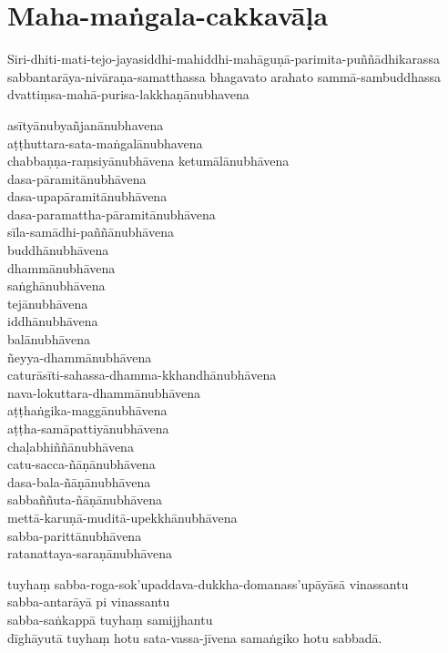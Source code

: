 
\section{Maha-maṅgala-cakkavāḷa}


Siri-dhiti-mati-tejo-jayasiddhi-mahiddhi-mahāguṇā-parimita-puññādhikarassa
sabbantarāya-nivāraṇa-samatthassa bhagavato arahato sammā-sambuddhassa
dvattiṃsa-mahā-purisa-lakkhaṇānubhavena

asītyānubyañjanānubhavena\\
aṭṭhuttara-sata-maṅgalānubhavena\\
chabbaṇṇa-raṃsiyānubhāvena ketumālānubhāvena\\
dasa-pāramitānubhāvena\\
dasa-upapāramitānubhāvena\\
dasa-paramattha-pāramitānubhāvena\\
sīla-samādhi-paññānubhāvena\\
buddhānubhāvena\\
dhammānubhāvena\\
saṅghānubhāvena\\
tejānubhāvena\\
iddhānubhāvena\\
balānubhāvena\\
ñeyya-dhammānubhāvena\\
caturāsīti-sahassa-dhamma-kkhandhānubhāvena\\
nava-lokuttara-dhammānubhāvena\\
aṭṭhaṅgika-maggānubhāvena\\
aṭṭha-samāpattiyānubhāvena\\
chaḷabhiññānubhāvena\\
catu-sacca-ñāṇānubhāvena\\
dasa-bala-ñāṇānubhāvena\\
sabbaññuta-ñāṇānubhāvena\\
mettā-karuṇā-muditā-upekkhānubhāvena\\
sabba-parittānubhāvena\\
ratanattaya-saraṇānubhāvena

tuyhaṃ sabba-roga-sok'upaddava-dukkha-domanass'upāyāsā vinassantu\\
sabba-antarāyā pi vinassantu\\
sabba-saṅkappā tuyhaṃ samijjhantu\\
dīghāyutā tuyhaṃ hotu sata-vassa-jīvena samaṅgiko hotu sabbadā.

